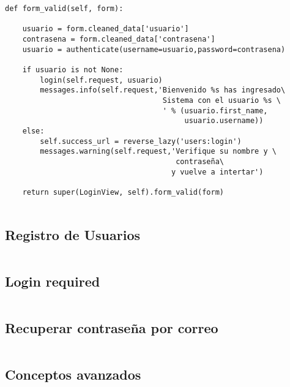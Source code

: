 \documentclass[xcolor=dvipsnames]{beamer}
\begin{document}
\begin{frame}[fragile]
\begin{verbatim}
def form_valid(self, form):
        
    usuario = form.cleaned_data['usuario']
    contrasena = form.cleaned_data['contrasena']
    usuario = authenticate(username=usuario,password=contrasena)
        
    if usuario is not None:
        login(self.request, usuario)
        messages.info(self.request,'Bienvenido %s has ingresado\
                                    Sistema con el usuario %s \
                                    ' % (usuario.first_name,
                                         usuario.username))
    else:
        self.success_url = reverse_lazy('users:login')
        messages.warning(self.request,'Verifique su nombre y \
                                       contraseña\
                                      y vuelve a intertar')

    return super(LoginView, self).form_valid(form)
 
\end{verbatim}
\end{frame}

\subsection{Registro de Usuarios}
\begin{frame}[fragile]
\begin{verbatim}

\end{verbatim}
\end{frame}

\subsection{Login required}
\begin{frame}[fragile]
\begin{verbatim}

\end{verbatim}
\end{frame}

\subsection{Recuperar contraseña por correo}
\begin{frame}[fragile]
\begin{verbatim}

\end{verbatim}
\end{frame}

\subsection{Conceptos avanzados}
\begin{frame}[fragile]
\begin{verbatim}

\end{verbatim}
\end{frame}
\end{document}
